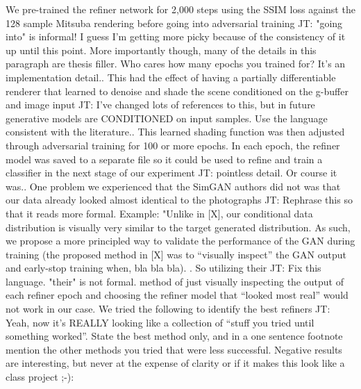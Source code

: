 \documentclass[10pt,twocolumn,letterpaper]{article}
\newcommand{\tompson}[1]{{\color{green} JT: #1}}
\begin{document}
We pre-trained the refiner network for 2,000 steps using the SSIM loss against the 128 sample Mitsuba rendering before going into adversarial training \tompson{"going into" is informal! I guess I'm getting more picky because of the consistency of it up until this point. More importantly though, many of the details in this paragraph are thesis filler. Who cares how many epochs you trained for? It's an implementation detail.}.  This had the effect of having a partially differentiable renderer that learned to denoise and shade the scene conditioned on the g-buffer and image input \tompson{I've changed lots of references to this, but in future generative models are CONDITIONED on input samples. Use the language consistent with the literature.}.  This learned shading function was then adjusted through adversarial training for 100 or more epochs.  In each epoch, the refiner model was saved to a separate file so it could be used to refine and train a classifier in the next stage of our experiment \tompson{pointless detail. Or course it was.}.  One problem we experienced that the SimGAN authors did not was that our data already looked almost identical to the photographs \tompson{Rephrase this so that it reads more formal. Example: "Unlike in [X], our conditional data distribution is visually very similar to the target generated distribution. As such, we propose a more principled way to validate the performance of the GAN during training (the proposed method in [X] was to ``visually inspect'' the GAN output and early-stop training when, bla bla bla). }. So utilizing their \tompson{Fix this language. "their" is not formal.} method of just visually inspecting the output of each refiner epoch and choosing the refiner model that ``looked most real'' would not work in our case. We tried the following to identify the best refiners \tompson{Yeah, now it's REALLY looking like a collection of ``stuff you tried until something worked''. State the best method only, and in a one sentence footnote mention the other methods you tried that were less successful. Negative results are interesting, but never at the expense of clarity or if it makes this look like a class project ;-)}:
\end{document}
